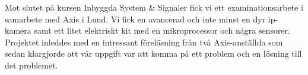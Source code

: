 

\begin{acknowledgements}      %

Mot slutet på kursen Inbyggda System & Signaler fick vi ett examinationsarbete i samarbete med Axis i Lund. Vi fick en avancerad och inte minst en dyr ip-kamera samt ett litet elektriskt kit med en mikroprocessor och några sensorer. Projektet inleddes med en intressant föreläsning från två Axis-anställda som sedan klargjorde att vår uppgift var att komma på ett problem och en lösning till det problemet. 
\end{acknowledgements}



